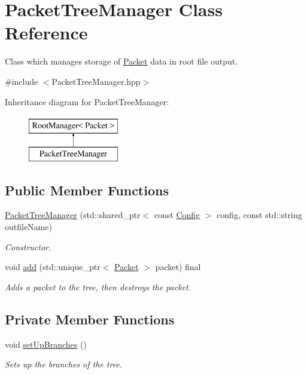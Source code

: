 \hypertarget{class_packet_tree_manager}{}\section{Packet\+Tree\+Manager Class Reference}
\label{class_packet_tree_manager}


Class which manages storage of \hyperlink{class_packet}{Packet} data in root file output.  




{\ttfamily \#include $<$Packet\+Tree\+Manager.\+hpp$>$}

Inheritance diagram for Packet\+Tree\+Manager\+:\begin{figure}[H]
\begin{center}
\leavevmode
\includegraphics[height=2.000000cm]{class_packet_tree_manager}
\end{center}
\end{figure}
\subsection*{Public Member Functions}
\begin{DoxyCompactItemize}
\item 
\hyperlink{class_packet_tree_manager_ab5393bcd3be4255232d9750cf85a4b13}{Packet\+Tree\+Manager} (std\+::shared\+\_\+ptr$<$ const \hyperlink{class_config}{Config} $>$ config, const std\+::string outfile\+Name)
\begin{DoxyCompactList}\small\item\em Constructor. \end{DoxyCompactList}\item 
void \hyperlink{class_packet_tree_manager_a855e71512fe6365c11f312584afff70a}{add} (std\+::unique\+\_\+ptr$<$ \hyperlink{class_packet}{Packet} $>$ packet) final
\begin{DoxyCompactList}\small\item\em Adds a packet to the tree, then destroys the packet. \end{DoxyCompactList}\end{DoxyCompactItemize}
\subsection*{Private Member Functions}
\begin{DoxyCompactItemize}
\item 
void \hyperlink{class_packet_tree_manager_a3e2aa24c5acd8a87b15cfff2d011f30b}{set\+Up\+Branches} ()
\begin{DoxyCompactList}\small\item\em Sets up the branches of the tree. \end{DoxyCompactList}\end{DoxyCompactItemize}

